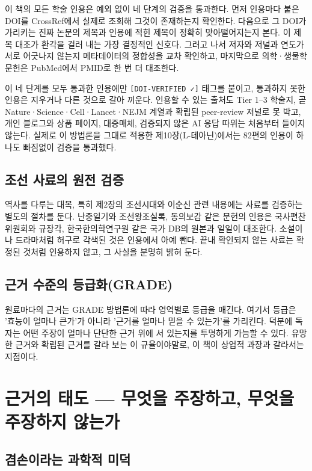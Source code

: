\documentclass[12pt,oneside]{book}
\begin{document}
이 책의 모든 학술 인용은 예외 없이 네 단계의 검증을 통과한다. 먼저 인용마다 붙은 DOI를 CrossRef에서 실제로 조회해 그것이 존재하는지 확인한다. 다음으로 그 DOI가 가리키는 진짜 논문의 제목과 인용에 적힌 제목이 정확히 맞아떨어지는지 본다. 이 제목 대조가 환각을 걸러 내는 가장 결정적인 신호다. 그러고 나서 저자와 저널과 연도가 서로 어긋나지 않는지 메타데이터의 정합성을 교차 확인하고, 마지막으로 의학·생물학 문헌은 PubMed에서 PMID로 한 번 더 대조한다.

이 네 단계를 모두 통과한 인용에만 \texttt{[DOI-VERIFIED ✓]} 태그를 붙이고, 통과하지 못한 인용은 지우거나 다른 것으로 갈아 끼운다. 인용할 수 있는 출처도 Tier 1–3 학술지, 곧 Nature·Science·Cell·Lancet·NEJM 계열과 확립된 peer-review 저널로 못 박고, 개인 블로그와 상품 페이지, 대중매체, 검증되지 않은 AI 응답 따위는 처음부터 들이지 않는다. 실제로 이 방법론을 그대로 적용한 제10장(L-테아닌)에서는 82편의 인용이 하나도 빠짐없이 검증을 통과했다.

\subsection{조선 사료의 원전 검증}

역사를 다루는 대목, 특히 제2장의 조선시대와 이순신 관련 내용에는 사료를 검증하는 별도의 절차를 둔다. 난중일기와 조선왕조실록, 동의보감 같은 문헌의 인용은 국사편찬위원회와 규장각, 한국한의학연구원 같은 국가 DB의 원본과 일일이 대조한다. 소설이나 드라마처럼 허구로 각색된 것은 인용에서 아예 뺀다. 끝내 확인되지 않는 사료는 확정된 것처럼 인용하지 않고, 그 사실을 분명히 밝혀 둔다.

\subsection{근거 수준의 등급화(GRADE)}

원료마다의 근거는 GRADE 방법론에 따라 영역별로 등급을 매긴다. 여기서 등급은 '효능이 얼마나 큰가'가 아니라 '근거를 얼마나 믿을 수 있는가'를 가리킨다. 덕분에 독자는 어떤 주장이 얼마나 단단한 근거 위에 서 있는지를 투명하게 가늠할 수 있다. 유망한 근거와 확립된 근거를 갈라 보는 이 규율이야말로, 이 책이 상업적 과장과 갈라서는 지점이다.

\section{근거의 태도 — 무엇을 주장하고, 무엇을 주장하지 않는가}

\subsection{겸손이라는 과학적 미덕}
\end{document}
